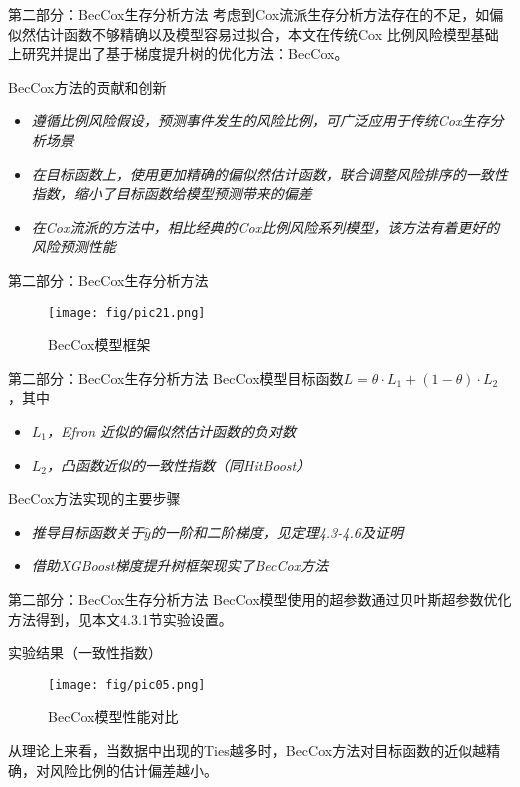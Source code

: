 \documentclass[10pt]{beamer}
\begin{document}
\begin{frame}{第二部分：BecCox生存分析方法}
  考虑到Cox流派生存分析方法存在的不足，如偏似然估计函数不够精确以及模型容易过拟合，本文在传统Cox 比例风险模型基础上研究并提出了基于梯度提升树的优化方法：BecCox。

  BecCox方法的贡献和创新
  \begin{itemize}
    \item \textit{遵循比例风险假设，预测事件发生的风险比例，可广泛应用于传统Cox生存分析场景}
    \item \textit{在目标函数上，使用更加精确的偏似然估计函数，联合调整风险排序的一致性指数，缩小了目标函数给模型预测带来的偏差}
    \item \textit{在Cox流派的方法中，相比经典的Cox比例风险系列模型，该方法有着更好的风险预测性能}
  \end{itemize}
  
\end{frame}

\begin{frame}{第二部分：BecCox生存分析方法}
  \begin{figure}[H]
    \centering
    \texttt{[image: fig/pic21.png]}
    \caption{BecCox模型框架}
  \end{figure}
  
\end{frame}

\begin{frame}{第二部分：BecCox生存分析方法}
  BecCox模型目标函数$L=\theta \cdot L_1 + (1-\theta) \cdot L_2$，其中
  \begin{itemize}
    \item \textit{$L_1$，Efron 近似的偏似然估计函数的负对数}
    \item \textit{$L_2$，凸函数近似的一致性指数（同HitBoost）}
  \end{itemize}

  BecCox方法实现的主要步骤
  \begin{itemize}
    \item \textit{推导目标函数关于$\hat{y}$的一阶和二阶梯度，见定理4.3-4.6及证明}
    \item \textit{借助XGBoost梯度提升树框架现实了BecCox方法}
  \end{itemize}
\end{frame}

\begin{frame}{第二部分：BecCox生存分析方法}
  BecCox模型使用的超参数通过贝叶斯超参数优化方法得到，见本文4.3.1节实验设置。

  实验结果（一致性指数）
  \begin{figure}[H]
    \centering
    \texttt{[image: fig/pic05.png]}
    \caption{BecCox模型性能对比}
  \end{figure}

  从理论上来看，当数据中出现的Ties越多时，BecCox方法对目标函数的近似越精确，对风险比例的估计偏差越小。
\end{frame}
\end{document}
